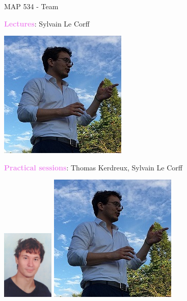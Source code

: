 \documentclass[9pt]{beamer}
\begin{document}
\begin{frame}{MAP 534 - Team}

\textcolor{violet}{{\bf Lectures}}: \textcolor{lighto}{Sylvain Le Corff}
\begin{center}
\includegraphics[scale=.4]{portrait}
\end{center}

\textcolor{violet}{{\bf Practical sessions}}: \textcolor{lighto}{Thomas Kerdreux, Sylvain Le Corff}
\begin{center}
\includegraphics[scale = .8]{kerdreux}
\includegraphics[scale=.4]{portrait}
\end{center}



\end{frame}
\end{document}
